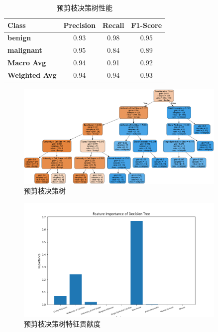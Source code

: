 \documentclass[a4paper,12pt,onecolumn,oneside]{article}
\begin{document}
		\begin{table}[H]
		\centering
		\begin{tabular}{lccc}
			\toprule
			\textbf{Class} & \textbf{Precision} & \textbf{Recall} & \textbf{F1-Score} \\
			\midrule
			\textbf{benign} & 0.93 & 0.98 & 0.95 \\
			\textbf{malignant} & 0.95 & 0.84 & 0.89 \\
			\midrule
			\textbf{Macro Avg} & 0.94 & 0.91 & 0.92 \\
			\textbf{Weighted Avg} & 0.94 & 0.94 & 0.93 \\
			\bottomrule
		\end{tabular}
		\caption{预剪枝决策树性能}
		\label{tbl:1}
	\end{table}
	\begin{figure}[H]
		\centering
		\includegraphics[width=0.9\textwidth]{res3/trees/tree_1.png}
		\caption{预剪枝决策树}
		\label{fig:tree1}
	\end{figure}

	\begin{figure}[H]
		\centering
		\includegraphics[width=0.9\textwidth]{res3/bestparam_importance.png}
		\caption{预剪枝决策树特征贡献度}
		\label{fig:bestimportance}
	\end{figure}
	
\end{document}
